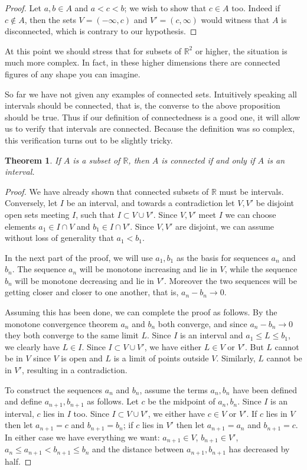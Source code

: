 \documentclass[11pt,oneside]{amsbook}
\newcommand{\RR}{\mathbb R}
\theoremstyle{definition}
\theoremstyle{plain}
\newtheorem{thm}{Theorem}[section]
\theoremstyle{definition}
\theoremstyle{remark}
\numberwithin{equation}{section}
\numberwithin{figure}{section}
\begin{document}
\begin{proof}
  Let $a,b\in A$ and $a<c<b$; we wish to show that $c\in A$ too. Indeed if $c\notin A$, then the sets $V=(-\infty,c)$ and $V'=(c,\infty)$ would witness that $A$ is disconnected, which is contrary to our hypothesis.
\end{proof}

At this point we should stress that for subsets of $\RR^2$ or higher, the situation is much more complex. In fact, in these higher dimensions there are connected figures of any shape you can imagine.

So far we have not given any examples of connected sets. Intuitively speaking all intervals should be connected, that is, the converse to the above proposition should be true. Thus if our definition of connectedness is a good one, it will allow us to verify that intervals are connected. Because the definition was so complex, this verification turns out to be slightly tricky.

\begin{thm}
  If $A$ is a subset of $\RR$, then $A$ is connected if and only if $A$ is an interval.
\end{thm}

\begin{proof}
  We have already shown that connected subsets of $\RR$ must be intervals. Conversely, let $I$ be an interval, and towards a contradiction let $V,V'$ be disjoint open sets meeting $I$, such that $I\subset V\cup V'$. Since $V,V'$ meet $I$ we can choose elements $a_1\in I\cap V$ and $b_1\in I\cap V'$. Since $V,V'$ are disjoint, we can assume without loss of generality that $a_1<b_1$.

  In the next part of the proof, we will use $a_1,b_1$ as the basis for sequences $a_n$ and $b_n$. The sequence $a_n$ will be monotone increasing and lie in $V$, while the sequence $b_n$ will be monotone decreasing and lie in $V'$. Moreover the two sequences will be getting closer and closer to one another, that is, $a_n-b_n\to0$.

  Assuming this has been done, we can complete the proof as follows. By the monotone convergence theorem $a_n$ and $b_n$ both converge, and since $a_n-b_n\to0$ they both converge to the same limit $L$. Since $I$ is an interval and $a_1\leq L\leq b_1$, we clearly have $L\in I$. Since $I\subset V\cup V'$, we have either $L\in V$ or $V'$. But $L$ cannot be in $V$ since $V$ is open and $L$ is a limit of points outside $V$. Similarly, $L$ cannot be in $V'$, resulting in a contradiction.

  To construct the sequences $a_n$ and $b_n$, assume the terms $a_n,b_n$ have been defined and define $a_{n+1},b_{n+1}$ as follows. Let $c$ be the midpoint of $a_n,b_n$. Since $I$ is an interval, $c$ lies in $I$ too. Since $I\subset V\cup V'$, we either have $c\in V$ or $V'$. If $c$ lies in $V$ then let $a_{n+1}=c$ and $b_{n+1}=b_n$; if $c$ lies in $V'$ then let $a_{n+1}=a_n$ and $b_{n+1}=c$. In either case we have everything we want: $a_{n+1}\in V$, $b_{n+1}\in V'$, $a_n\leq a_{n+1}<b_{n+1}\leq b_n$ and the distance between $a_{n+1},b_{n+1}$ has decreased by half.
\end{proof}
\end{document}
